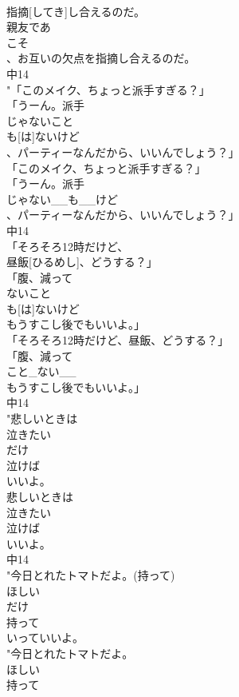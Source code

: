 \documentclass[8pt]{extreport}
\begin{document}
\begin{CJK}{UTF8}{min}
\\	指摘[してき]し合えるのだ。
\\	親友であ
\\	こそ
\\	、お互いの欠点を指摘し合えるのだ。
\\	中14
\\	"「このメイク、ちょっと派手すぎる？」
\\	「うーん。派手
\\	じゃないこと
\\	も[は]ないけど
\\	、パーティーなんだから、いいんでしょう？」
\\	「このメイク、ちょっと派手すぎる？」
\\	「うーん。派手
\\	じゃない__も__けど
\\	、パーティーなんだから、いいんでしょう？」
\\	中14
\\	「そろそろ12時だけど、
\\	昼飯[ひるめし]、どうする？」
\\	「腹、減って
\\	ないこと
\\	も[は]ないけど
\\	もうすこし後でもいいよ。」
\\	「そろそろ12時だけど、昼飯、どうする？」
\\	「腹、減って
\\	こと_ない__
\\	もうすこし後でもいいよ。」
\\	中14
\\	"悲しいときは
\\	泣きたい
\\	だけ
\\	泣けば
\\	いいよ。
\\	悲しいときは
\\	泣きたい
\\	泣けば
\\	いいよ。
\\	中14
\\	"今日とれたトマトだよ。(持って)
\\	ほしい
\\	だけ
\\	持って
\\	いっていいよ。
\\	"今日とれたトマトだよ。
\\	ほしい
\\	持って

\end{CJK}
\end{document}
